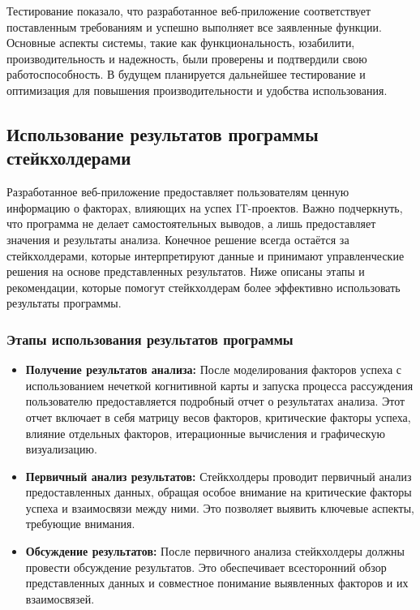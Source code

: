 \documentclass{article}
\begin{document}
    Тестирование показало, что разработанное веб-приложение соответствует поставленным требованиям и успешно выполняет все заявленные функции. Основные аспекты системы, такие как функциональность, юзабилити, производительность и надежность, были проверены и подтвердили свою работоспособность. В будущем планируется дальнейшее тестирование и оптимизация для повышения производительности и удобства использования.

    \subsection{Использование результатов программы стейкхолдерами}

    Разработанное веб-приложение предоставляет пользователям ценную информацию о факторах, влияющих на успех IT-проектов. Важно подчеркнуть, что программа не делает самостоятельных выводов, а лишь предоставляет значения и результаты анализа. Конечное решение всегда остаётся за стейкхолдерами, которые интерпретируют данные и принимают управленческие решения на основе представленных результатов. Ниже описаны этапы и рекомендации, которые помогут стейкхолдерам более эффективно использовать результаты программы.

    \subsubsection{Этапы использования результатов программы}

    \begin{itemize}
        \item \textbf{Получение результатов анализа:}
        После моделирования факторов успеха с использованием нечеткой когнитивной карты и запуска процесса рассуждения пользователю предоставляется подробный отчет о результатах анализа. Этот отчет включает в себя матрицу весов факторов, критические факторы успеха, влияние отдельных факторов, итерационные вычисления и графическую визуализацию.
        \item \textbf{Первичный анализ результатов:}
        Стейкхолдеры проводит первичный анализ предоставленных данных, обращая особое внимание на критические факторы успеха и взаимосвязи между ними. Это позволяет выявить ключевые аспекты, требующие внимания.
        \item \textbf{Обсуждение результатов:}
        После первичного анализа стейкхолдеры должны провести обсуждение результатов. Это обеспечивает всесторонний обзор представленных данных и совместное понимание выявленных факторов и их взаимосвязей.
    \end{itemize}
\end{document}
